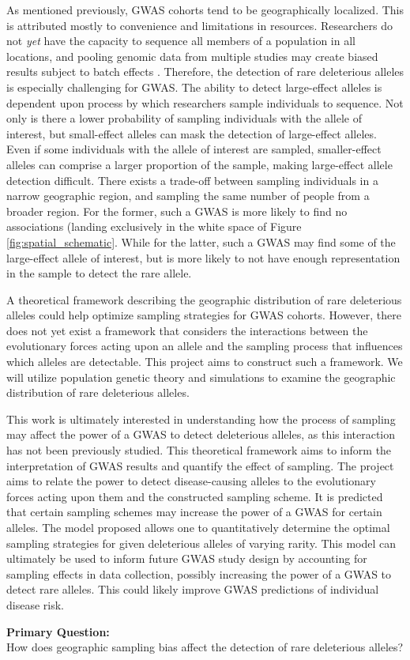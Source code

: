 As mentioned previously, GWAS cohorts tend to be geographically localized. This is attributed mostly to convenience and limitations in resources. Researchers do not \textit{yet} have the capacity to sequence all members of a population in all locations, and pooling genomic data from multiple studies may create biased results subject to batch effects \cite{woolston_potential_2015}\cite{gilad_reanalysis_2015}. Therefore, the detection of rare deleterious alleles is especially challenging for GWAS. The ability to detect large-effect alleles is dependent upon process by which researchers sample individuals to sequence. Not only is there a lower probability of sampling individuals with the allele of interest, but small-effect alleles can mask the detection of large-effect alleles. Even if some individuals with the allele of interest are sampled, smaller-effect alleles can comprise a larger proportion of the sample, making large-effect allele detection difficult. There exists a trade-off between sampling individuals in a narrow geographic region, and sampling the same number of people from a broader region. For the former, such a GWAS is more likely to find no associations (landing exclusively in the white space of Figure \ref{fig:spatial_schematic}. While for the latter, such a GWAS may find some of the large-effect allele of interest, but is more likely to not have enough representation in the sample to detect the rare allele. 


A theoretical framework describing the geographic distribution of rare deleterious alleles could help optimize sampling strategies for GWAS cohorts. However, there does not yet exist a framework that considers the interactions between the evolutionary forces acting upon an allele and the sampling process that influences which alleles are detectable. This project aims to construct such a framework. We will utilize population genetic theory and simulations to examine the geographic distribution of rare deleterious alleles. 


This work is ultimately interested in understanding how the process of sampling may affect the power of a GWAS to detect deleterious alleles, as this interaction has not been previously studied. This theoretical framework aims to inform the interpretation of GWAS results and quantify the effect of sampling. The project aims to relate the power to detect disease-causing alleles to the evolutionary forces acting upon them and the constructed sampling scheme. It is predicted that certain sampling schemes may increase the power of a GWAS for certain alleles. The model proposed allows one to quantitatively determine the optimal sampling strategies for given deleterious alleles of varying rarity. This model can ultimately be used to inform future GWAS study design by accounting for sampling effects in data collection, possibly increasing the power of a GWAS to detect rare alleles. This could likely improve GWAS predictions of individual disease risk.


\begin{center}
    \textbf{Primary Question:} \\
    How  does geographic sampling bias affect the detection of rare deleterious alleles?
\end{center}